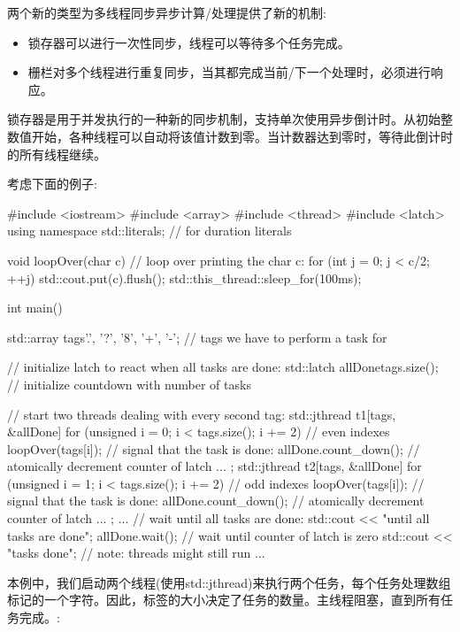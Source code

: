 
两个新的类型为多线程同步异步计算/处理提供了新的机制:

\begin{itemize}
\item 
锁存器可以进行一次性同步，线程可以等待多个任务完成。

\item 
栅栏对多个线程进行重复同步，当其都完成当前/下一个处理时，必须进行响应。
\end{itemize}


锁存器是用于并发执行的一种新的同步机制，支持单次使用异步倒计时。从初始整数值开始，各种线程可以自动将该值计数到零。当计数器达到零时，等待此倒计时的所有线程继续。

考虑下面的例子:


\begin{cpp}
#include <iostream>
#include <array>
#include <thread>
#include <latch>
using namespace std::literals; // for duration literals

void loopOver(char c) {
	// loop over printing the char c:
	for (int j = 0; j < c/2; ++j) {
		std::cout.put(c).flush();
		std::this_thread::sleep_for(100ms);
	}
}

int main()
{
	std::array tags{'.', '?', '8', '+', '-'}; // tags we have to perform a task for
	
	// initialize latch to react when all tasks are done:
	std::latch allDone{tags.size()}; // initialize countdown with number of tasks
	
	// start two threads dealing with every second tag:
	std::jthread t1{[tags, &allDone] {
			for (unsigned i = 0; i < tags.size(); i += 2) { // even indexes
				loopOver(tags[i]);
				// signal that the task is done:
				allDone.count_down(); // atomically decrement counter of latch
			}
			...
	}};
	std::jthread t2{[tags, &allDone] {
			for (unsigned i = 1; i < tags.size(); i += 2) { // odd indexes
				loopOver(tags[i]);
				// signal that the task is done:
				allDone.count_down(); // atomically decrement counter of latch
			}
			...
	}};
	...
	// wait until all tasks are done:
	std::cout << "\nwaiting until all tasks are done\n";
	allDone.wait(); // wait until counter of latch is zero
	std::cout << "\nall tasks done\n"; // note: threads might still run
	...
}
\end{cpp}

本例中，我们启动两个线程(使用std::jthread)来执行两个任务，每个任务处理数组标记的一个字符。因此，标签的大小决定了任务的数量。主线程阻塞，直到所有任务完成。:

